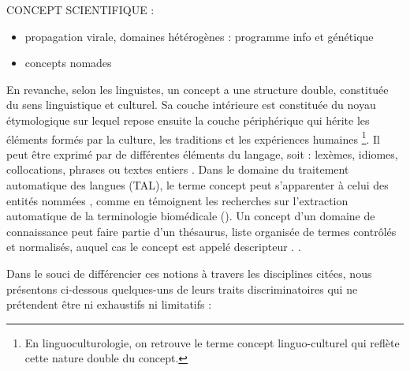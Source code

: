 CONCEPT SCIENTIFIQUE : 
\begin{itemize}
\item propagation virale, domaines hétérogènes : programme info et génétique
\item concepts nomades
\end{itemize}



En revanche, selon les linguistes, un concept a une structure double, constituée du sens linguistique et culturel.
Sa couche intérieure est constituée du noyau étymologique sur lequel repose ensuite la couche périphérique qui hérite les éléments formés par la culture, les traditions et les expériences humaines
\footnote{En linguoculturologie, on retrouve le terme \og{}concept linguo-culturel\fg{} qui reflète cette nature double du concept.}. Il peut être exprimé par de différentes éléments du langage, soit : lexèmes, idiomes, collocations, phrases ou textes entiers \citep[p.~5]{nemickiene2011concept}. Dans le domaine du traitement automatique des langues (\textsc{TAL}), le terme \og concept \fg{} peut s'apparenter à celui des \og entités nommées \fg{}, comme en témoignent les recherches sur l'extraction automatique de la terminologie biomédicale (\citealp{jolly2024exploring,navarro2023clinical}). Un concept d'un domaine de connaissance peut faire partie d'un thésaurus, liste organisée de termes contrôlés et normalisés, auquel cas le concept est appelé \og descripteur \fg{}. \citep[p.~16]{RENNESSON202015}.

Dans le souci de différencier ces notions à travers les disciplines citées, nous présentons ci-dessous quelques-uns de leurs traits discriminatoires qui ne prétendent être ni exhaustifs ni limitatifs :

